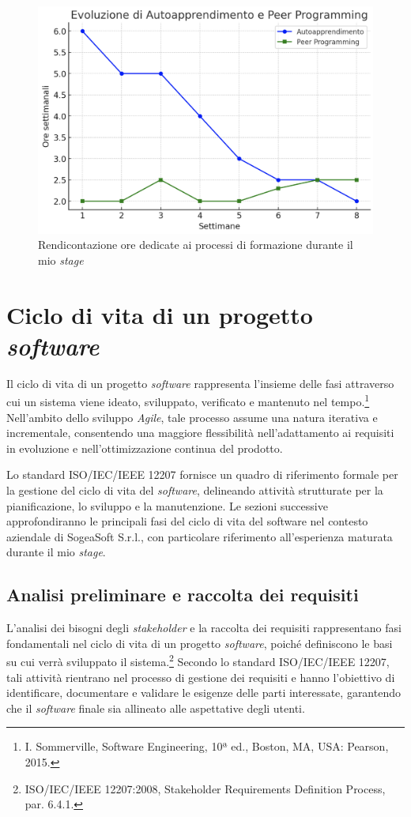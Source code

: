         \begin{figure} [H]
            \centering
            \includegraphics[width=0.8\linewidth]{BCS-Tessi/images/Rendicontazione_ore.png}
            \caption[Rendicontazione ore dedicate alla formazione]{Rendicontazione ore dedicate ai processi di formazione durante il mio \textit{stage}}
            \label{fig:Ore-formazione}
        \end{figure}
        

    \section{Ciclo di vita di un progetto \textit{software}}
    Il ciclo di vita di un progetto \textit{software} rappresenta l’insieme delle fasi attraverso cui un sistema viene ideato, sviluppato, verificato e mantenuto nel tempo.\footnote{I. Sommerville, Software Engineering, 10ª ed., Boston, MA, USA: Pearson, 2015.} Nell’ambito dello sviluppo \textit{Agile}, tale processo assume una natura iterativa e incrementale, consentendo una maggiore flessibilità nell’adattamento ai requisiti in evoluzione e nell’ottimizzazione continua del prodotto.

    \vspace{0.2 em}
    \noindent Lo standard ISO/IEC/IEEE 12207 fornisce un quadro di riferimento formale per la gestione del ciclo di vita del \textit{software}, delineando attività strutturate per la pianificazione, lo sviluppo e la manutenzione. Le sezioni successive approfondiranno le principali fasi del ciclo di vita del software nel contesto aziendale di SogeaSoft S.r.l., con particolare riferimento all’esperienza maturata durante il mio \textit{stage}.
        \subsection{Analisi preliminare e raccolta dei requisiti}
        L’analisi dei bisogni degli \textit{stakeholder} e la raccolta dei requisiti rappresentano fasi fondamentali nel ciclo di vita di un progetto \textit{software}, poiché definiscono le basi su cui verrà sviluppato il sistema.\footnote{ISO/IEC/IEEE 12207:2008, Stakeholder Requirements Definition Process, par. 6.4.1.} Secondo lo standard ISO/IEC/IEEE 12207, tali attività rientrano nel processo di gestione dei requisiti e hanno l’obiettivo di identificare, documentare e validare le esigenze delle parti interessate, garantendo che il \textit{software} finale sia allineato alle aspettative degli utenti. 

